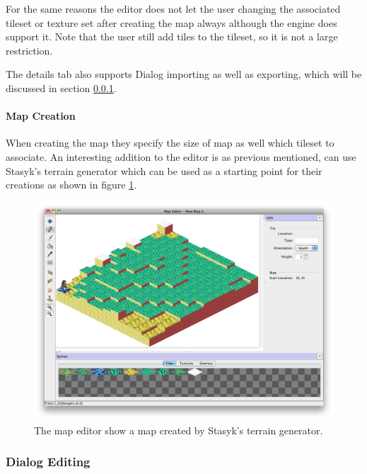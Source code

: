 For the same reasons the editor does not let the user changing the associated tileset or texture set after creating the map always although the engine does support it. Note that the user still add tiles to the tileset, so it is not a large restriction.

The details tab also supports Dialog importing as well as exporting, which will be discussed in section \ref{ssub:dialog_editing}.


\paragraph{Map Creation\\}
When creating the map they specify the size of map as well which tileset to associate.  An interesting addition to the editor is as previous mentioned, can use Stasyk's terrain generator which can be used as a starting point for their creations as shown in figure \ref{fig:figures_editor_gen}.

\begin{figure}[htbp]
	\centering
		\includegraphics[width=\textwidth]{figures/editor/gen.png}
	\caption{The map editor show a map created by Stasyk's terrain generator.}
	\label{fig:figures_editor_gen}
\end{figure}


\clearpage
\subsubsection{Dialog Editing}
\label{ssub:dialog_editing}

